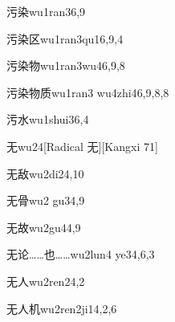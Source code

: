 \begin{verbete}{污染}{wu1ran3}{6,9}
\end{verbete}

\begin{verbete}{污染区}{wu1ran3qu1}{6,9,4}
\end{verbete}

\begin{verbete}{污染物}{wu1ran3wu4}{6,9,8}
\end{verbete}

\begin{verbete}{污染物质}{wu1ran3 wu4zhi4}{6,9,8,8}
\end{verbete}

\begin{verbete}{污水}{wu1shui3}{6,4}
\end{verbete}

\begin{verbete}{无}{wu2}{4}[Radical 无][Kangxi 71]
\end{verbete}

\begin{verbete}{无敌}{wu2di2}{4,10}
\end{verbete}

\begin{verbete}{无骨}{wu2 gu3}{4,9}
\end{verbete}

\begin{verbete}{无故}{wu2gu4}{4,9}
\end{verbete}

\begin{verbete}{无论……也……}{wu2lun4 ye3}{4,6,3}
\end{verbete}

\begin{verbete}{无人}{wu2ren2}{4,2}
\end{verbete}

\begin{verbete}{无人机}{wu2ren2ji1}{4,2,6}
\end{verbete}


